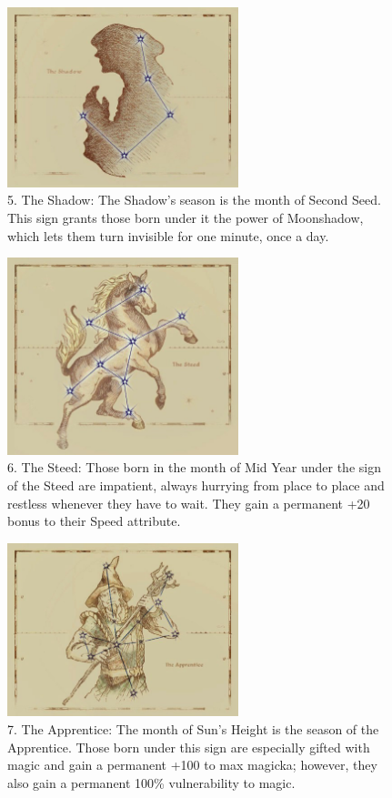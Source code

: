 \documentclass[12pt]{book}
\begin{document}
\begin{figure}[H]
\includegraphics[width=0.6\textwidth]{Shadow.png}
\centering
\caption*{5. The Shadow: The Shadow's season is the month of Second Seed. This sign grants those born under it the power of Moonshadow, which lets them turn invisible for one minute, once a day.}
\end{figure}

\begin{figure}[H]
\includegraphics[width=0.6\textwidth]{Steed.png}
\centering
\caption*{6. The Steed: Those born in the month of Mid Year under the sign of the Steed are impatient, always hurrying from place to place and restless whenever they have to wait. They gain a permanent +20 bonus to their Speed attribute.}
\end{figure}

\begin{figure}[H]
\includegraphics[width=0.6\textwidth]{Apprentice.png}
\centering
\caption*{7. The Apprentice: The month of Sun's Height is the season of the Apprentice. Those born under this sign are especially gifted with magic and gain a permanent +100 to max magicka; however, they also gain a permanent 100\% vulnerability to magic.}
\end{figure}
\end{document}
